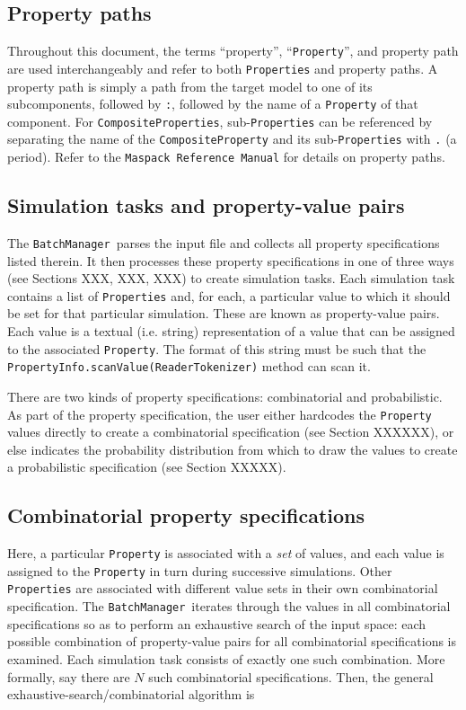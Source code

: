 \documentclass{article}
\newcommand{\BM}{{\tt BatchManager}}
\begin{document}
\subsection{Property paths}

Throughout this document, the terms ``property'', ``{\tt Property}'', and property path are used interchangeably and refer to both {\tt Properties} and property paths. A property path is simply a path from the target model to one of its subcomponents, followed by {\tt :}, followed by the name of a {\tt Property} of that component. For {\tt CompositeProperties}, sub-{\tt Properties} can be referenced by separating the name of the {\tt CompositeProperty} and its sub-{\tt Properties} with {\tt .} (a period). Refer to the {\tt Maspack Reference Manual} for details on property paths.

\subsection{Simulation tasks and property-value pairs}

The \BM\ parses the input file and collects all property specifications listed therein. It then processes these property specifications in one of three ways (see Sections XXX, XXX, XXX) to create simulation tasks. Each simulation task contains a list of {\tt Properties} and, for each, a particular value to which it should be set for that particular simulation. These are known as property-value pairs. Each value is a textual (i.e. string) representation of a value that can be assigned to the associated {\tt Property}. The format of this string must be such that the {\tt PropertyInfo.scanValue(ReaderTokenizer)} method can scan it.

There are two kinds of property specifications: combinatorial and probabilistic. As part of the property specification, the user either hardcodes the {\tt Property} values directly to create a combinatorial specification (see Section XXXXXX), or else indicates the probability distribution from which to draw the values to create a probabilistic specification (see Section XXXXX).

\subsection{Combinatorial property specifications}

Here, a particular {\tt Property} is associated with a \textit{set} of values, and each value is assigned to the {\tt Property} in turn during successive simulations. Other {\tt Properties} are associated with different value sets in their own combinatorial specification. The \BM\ iterates through the values in all combinatorial specifications so as to perform an exhaustive search of the input space: each possible combination of property-value pairs for all combinatorial specifications is examined. Each simulation task consists of exactly one such combination. More formally, say there are $N$ such combinatorial specifications. Then, the general exhaustive-search/combinatorial algorithm is
\end{document}
